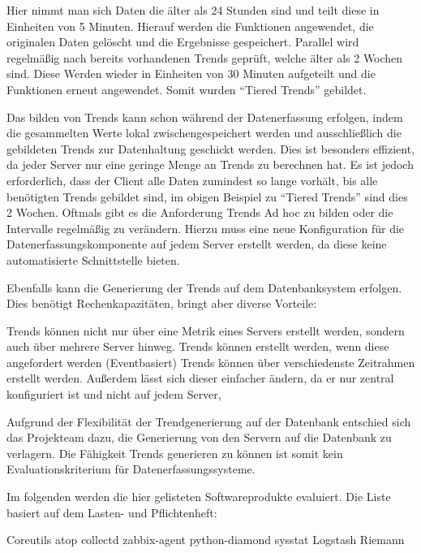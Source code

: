 Hier nimmt man sich Daten die älter als 24 Stunden sind und teilt diese in
Einheiten von 5 Minuten. Hierauf werden die Funktionen angewendet, die
originalen Daten gelöscht und die Ergebnisse gespeichert. Parallel wird
regelmäßig nach bereits vorhandenen Trends geprüft, welche älter als 2 Wochen
sind. Diese Werden wieder in Einheiten von 30 Minuten aufgeteilt und die
Funktionen erneut angewendet. Somit wurden ``Tiered Trends'' gebildet.

Das bilden von Trends kann schon während der Datenerfassung erfolgen, indem die
gesammelten Werte lokal zwischengespeichert werden und ausschließlich die
gebildeten Trends zur Datenhaltung geschickt werden. Dies ist besonders
effizient, da jeder Server nur eine geringe Menge an Trends zu berechnen hat.
Es ist jedoch erforderlich, dass der Client alle Daten zumindest so lange
vorhält, bis alle benötigten Trends gebildet sind, im obigen Beispiel zu
``Tiered Trends'' sind dies 2 Wochen. Oftmals gibt es die Anforderung Trends
Ad hoc zu bilden oder die Intervalle regelmäßig zu verändern. Hierzu muss eine
neue Konfiguration für die Datenerfassungskomponente auf jedem Server erstellt
werden, da diese keine automatisierte Schnittstelle bieten.

Ebenfalls kann die Generierung der Trends auf dem Datenbanksystem erfolgen.
Dies benötigt Rechenkapazitäten, bringt aber diverse Vorteile:

\begin{outline}
  \1 Trends können nicht nur über eine Metrik eines Servers erstellt werden,
  sondern auch über mehrere Server hinweg.
  \1 Trends können erstellt werden, wenn diese angefordert werden
  (Eventbasiert)
  \1 Trends können über verschiedenste Zeitrahmen erstellt werden. Außerdem
  lässt sich dieser einfacher ändern, da er nur zentral konfiguriert ist und
  nicht auf jedem Server,
\end{outline}

Aufgrund der Flexibilität der Trendgenerierung auf der Datenbank entschied sich
das Projekteam dazu, die Generierung von den Servern auf die Datenbank zu
verlagern. Die Fähigkeit Trends generieren zu können ist somit kein
Evaluationskriterium für Datenerfassungssysteme.

Im folgenden werden die hier gelisteten Softwareprodukte evaluiert. Die Liste
basiert auf dem Lasten- und Pflichtenheft:

\begin{outline}
  \1 Coreutils
  \1 atop
  \1 collectd
  \1 zabbix-agent
  \1 python-diamond
  \1 sysstat
  \1 Logstash
  \1 Riemann
\end{outline}
\tm%

